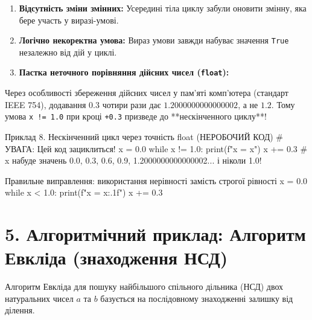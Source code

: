 \documentclass{scrreprt}
\begin{document}
	\begin{enumerate}[label=\arabic*.]
		\item \textbf{Відсутність зміни змінних:} Усередині тіла циклу забули оновити змінну, яка бере участь у виразі-умові.
		\item \textbf{Логічно некоректна умова:} Вираз умови завжди набуває значення \texttt{True} незалежно від дій у циклі.
		\item \textbf{Пастка неточного порівняння дійсних чисел (\texttt{float}):}
	\end{enumerate}
	
	\begin{tcolorbox}[colback=orange!10!white,colframe=orange,title=\textbf{Небезпека строгової рівності для float!},fonttitle=\sffamily\bfseries]
		Через особливості збереження дійсних чисел у пам'яті комп'ютера (стандарт IEEE 754), додавання $0.3$ чотири рази дає $1.2000000000000002$, а не $1.2$.
		Тому умова \texttt{x != 1.0} при кроці \texttt{+0.3} призведе до **нескінченного циклу**!
	\end{tcolorbox}
	
	\begin{py}{Приклад 8. Нескінченний цикл через точність float (НЕРОБОЧИЙ КОД)}
# УВАГА: Цей код зациклиться!
x = 0.0
while x != 1.0:
    print(f"x = {x}")
    x += 0.3  # x набуде значень 0.0, 0.3, 0.6, 0.9, 1.2000000000000002... і ніколи 1.0!
	\end{py}
	
	\begin{py}{Правильне виправлення: використання нерівності замість строгої рівності}
x = 0.0
while x < 1.0:
    print(f"x = {x:.1f}")
    x += 0.3
	\end{py}
	
	\section*{5. Алгоритмічний приклад: Алгоритм Евкліда (знаходження НСД)}
	
	Алгоритм Евкліда для пошуку найбільшого спільного дільника (НСД) двох натуральних чисел $a$ та $b$ базується на послідовному знаходженні залишку від ділення.
	
\end{document}
